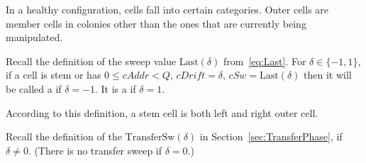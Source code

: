 \documentclass[12pt]{memoir}
\newcommand{\fld}[1]{\ensuremath{\textit{#1}}}
\newcommand{\cAddr}{\fld{cAddr}}
\newcommand{\cDrift}{\fld{cDrift}}
\newcommand{\cSweep}{\fld{cSw}}
\newcommand{\Last}{\mathrm{Last}}
\newcommand{\TransferSw}{\mathrm{TransferSw}}
\begin{document}
In a healthy configuration, cells fall into certain categories.
Outer cells are member cells in colonies other than the ones that 
are currently being manipulated.

\begin{definition}\label{def:outer-cells}
    Recall the definition of the sweep value
    \(  \Last(\delta)  \) from~\eqref{eq:Last}.
    For \( \delta \in \{ -1,1 \} \), if a cell is stem or
    has \( 0 \le \cAddr < Q \),
    \( \cDrift = \delta \),
    \( \cSweep = \Last(\delta) \)
    then it will be called a  if
    \( \delta = -1 \).
    It is a  if \( \delta = 1 \).
\end{definition}

According to this definition, a stem cell is both left and right outer cell.

Recall the definition of the 
\( \TransferSw(\delta) \) in Section~\ref{sec:TransferPhase}, if \( \delta \ne 0 \).
(There is no transfer sweep if \( \delta = 0 \).)
\end{document}
